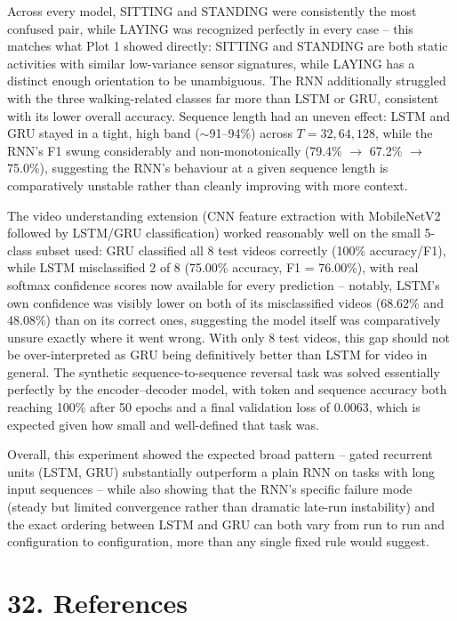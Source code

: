\documentclass[10pt]{article}
\begin{document}
Across every model, SITTING and STANDING were consistently the most
confused pair, while LAYING was recognized perfectly in every case -- this
matches what Plot 1 showed directly: SITTING and STANDING are both static
activities with similar low-variance sensor signatures, while LAYING has a
distinct enough orientation to be unambiguous. The RNN additionally
struggled with the three walking-related classes far more than LSTM or GRU,
consistent with its lower overall accuracy. Sequence length had an uneven
effect: LSTM and GRU stayed in a tight, high band ($\sim$91--94\%) across
$T=32,64,128$, while the RNN's F1 swung considerably and non-monotonically
(79.4\% $\to$ 67.2\% $\to$ 75.0\%), suggesting the RNN's behaviour at a
given sequence length is comparatively unstable rather than cleanly
improving with more context.

The video understanding extension (CNN feature extraction with MobileNetV2
followed by LSTM/GRU classification) worked reasonably well on the small
5-class subset used: GRU classified all 8 test videos correctly (100\%
accuracy/F1), while LSTM misclassified 2 of 8 (75.00\% accuracy, F1 =
76.00\%), with real softmax confidence scores now available for every
prediction -- notably, LSTM's own confidence was visibly lower on both of
its misclassified videos (68.62\% and 48.08\%) than on its correct ones,
suggesting the model itself was comparatively unsure exactly where it
went wrong. With only 8 test videos, this gap should not be over-interpreted
as GRU being definitively better than LSTM for video in general. The
synthetic sequence-to-sequence reversal task was solved essentially
perfectly by the encoder--decoder model, with token and sequence accuracy
both reaching 100\% after 50 epochs and a final validation loss of 0.0063,
which is expected given how small and well-defined that task was.

Overall, this experiment showed the expected broad pattern -- gated
recurrent units (LSTM, GRU) substantially outperform a plain RNN on tasks
with long input sequences -- while also showing that the RNN's specific
failure mode (steady but limited convergence rather than dramatic late-run
instability) and the exact ordering between LSTM and GRU can both vary from
run to run and configuration to configuration, more than any single
fixed rule would suggest.

\section*{32. References}
\end{document}
